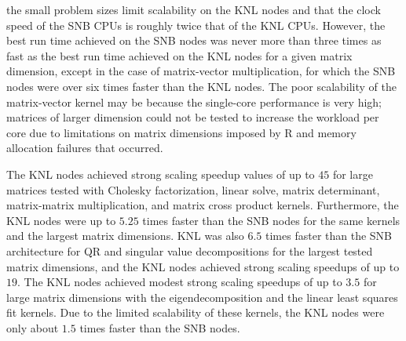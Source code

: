 the small problem sizes limit scalability on the KNL nodes and that the clock speed of the
SNB CPUs is roughly twice that of the KNL CPUs. However, the best run time achieved on the
SNB nodes was never more than three times as fast as the best run time achieved on the KNL
nodes for a given matrix dimension, except in the case of matrix-vector multiplication,
for which the SNB nodes were over six times faster than the KNL nodes. The poor
scalability of the matrix-vector kernel may be because the single-core performance is very
high; matrices of larger dimension could not be tested to increase the workload per
core due to limitations on matrix dimensions imposed by R and memory allocation failures
that occurred.

The KNL nodes achieved strong scaling speedup values of up to $45$ for large matrices
tested with Cholesky factorization, linear solve, matrix determinant, matrix-matrix
multiplication, and matrix cross product kernels.
Furthermore, the KNL nodes were up to $5.25$ times faster than the SNB nodes for the same
kernels and the largest matrix dimensions. KNL was also $6.5$ times faster than the SNB
architecture for QR and singular value decompositions for the largest tested matrix
dimensions, and the KNL nodes achieved strong scaling speedups of up to $19$. The KNL
nodes achieved modest strong scaling speedups of up to $3.5$ for large matrix dimensions
with the eigendecomposition and the linear least squares fit kernels.
Due to the limited scalability of these kernels, the KNL nodes were only about $1.5$ times
faster than the SNB nodes.

